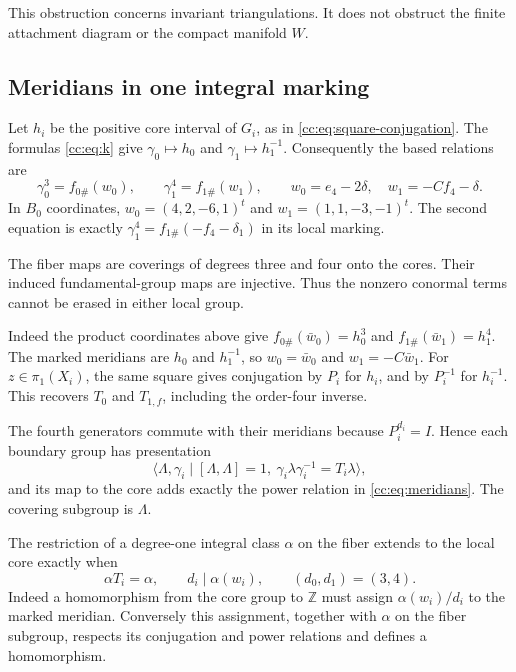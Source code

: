 This obstruction concerns invariant triangulations. It does not obstruct
the finite attachment diagram or the compact manifold $W$.

\subsection{Meridians in one integral marking}

Let $h_i$ be the positive core interval of $G_i$, as in
\eqref{cc:eq:square-conjugation}.
The formulas \eqref{cc:eq:k} give $\gamma_0\mapsto h_0$ and
$\gamma_1\mapsto h_1^{-1}$.
Consequently the based relations are
\begin{equation}\label{cc:eq:meridians}
\gamma_0^3=f_{0\#}(w_0),\qquad
\gamma_1^4=f_{1\#}(w_1),\qquad
w_0=e_4-2\delta,\quad w_1=-Cf_4-\delta.
\end{equation}
In $B_0$ coordinates, $w_0=(4,2,-6,1)^t$ and
$w_1=(1,1,-3,-1)^t$.
The second equation is exactly
$\gamma_1^4=f_{1\#}(-f_4-\delta_1)$ in its local marking.

The fiber maps are coverings of degrees three and four onto the cores.
Their induced fundamental-group maps are injective.
Thus the nonzero conormal terms cannot be erased in either local group.

Indeed the product coordinates above give
$f_{0\#}(\bar w_0)=h_0^3$ and $f_{1\#}(\bar w_1)=h_1^4$.
The marked meridians are $h_0$ and $h_1^{-1}$, so
$w_0=\bar w_0$ and $w_1=-C\bar w_1$.
For $z\in\pi_1(X_i)$, the same square gives conjugation by $P_i$
for $h_i$, and by $P_i^{-1}$ for $h_i^{-1}$.
This recovers $T_0$ and $T_{1,f}$, including the order-four inverse.

The fourth generators commute with their meridians because $P_i^{d_i}=I$.
Hence each boundary group has presentation
\[
\langle\Lambda,\gamma_i\mid[\Lambda,\Lambda]=1,
\ \gamma_i\lambda\gamma_i^{-1}=T_i\lambda\rangle,
\]
and its map to the core adds exactly the power relation in
\eqref{cc:eq:meridians}. The covering subgroup is $\Lambda$.

The restriction of a degree-one integral class $\alpha$ on the fiber
extends to the local core exactly when
\begin{equation}\label{cc:eq:congruences}
\alpha T_i=\alpha,\qquad d_i\mid\alpha(w_i),\qquad(d_0,d_1)=(3,4).
\end{equation}
Indeed a homomorphism from the core group to $\mathbb Z$ must assign
$\alpha(w_i)/d_i$ to the marked meridian.
Conversely this assignment, together with $\alpha$ on the fiber subgroup,
respects its conjugation and power relations and defines a homomorphism.

